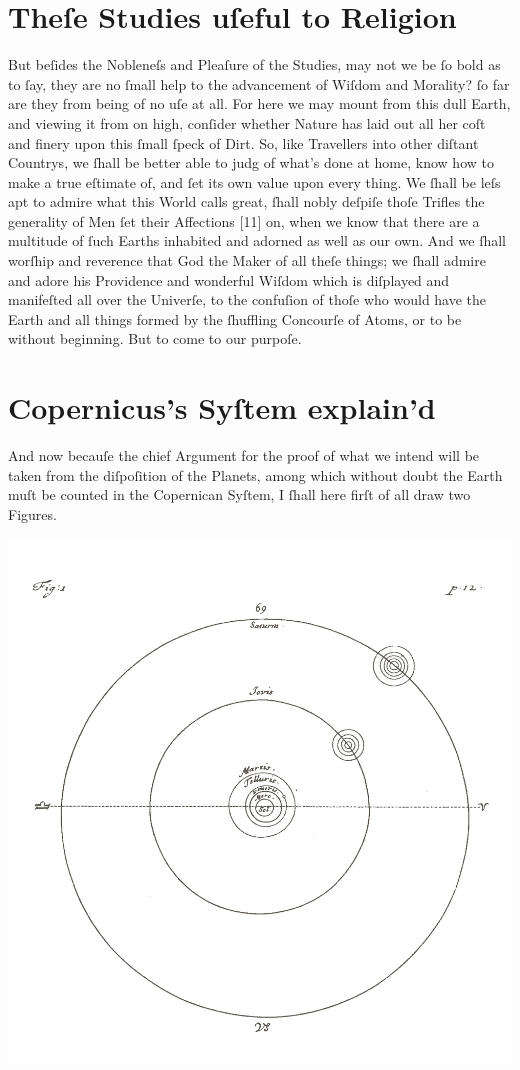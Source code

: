 \documentclass[letterpaper]{book}
\begin{document}
\section{Theſe Studies uſeful to Religion}

But beſides the Nobleneſs and Pleaſure of the Studies, may not we be ſo bold
as to ſay, they are no ſmall help to the advancement of Wiſdom and Morality?
ſo far are they from being of no uſe at all. For here we may mount from this
dull Earth, and viewing it from on high, conſider whether Nature has laid
out all her coſt and finery upon this ſmall ſpeck of Dirt.  So, like
Travellers into other diſtant Countrys, we ſhall be better able to judg of
what's done at home, know how to make a true eſtimate of, and ſet its own
value upon every thing. We ſhall be leſs apt to admire what this World calls
great, ſhall nobly deſpiſe thoſe Trifles the generality of Men ſet their
Affections [11] on, when we know that there are a multitude of ſuch Earths
inhabited and adorned as well as our own. And we ſhall worſhip and reverence
that God the Maker of all theſe things; we ſhall admire and adore his
Providence and wonderful Wiſdom which is diſplayed and manifeſted all over
the Univerſe, to the confuſion of thoſe who would have the Earth and all
things formed by the ſhuffling Concourſe of Atoms, or to be without
beginning. But to come to our purpoſe.


\section{Copernicus's Syſtem explain'd}

And now becauſe the chief Argument for the proof of what we intend will be
taken from the diſpoſition of the Planets, among which without doubt the
Earth muſt be counted in the Copernican Syſtem, I ſhall here firſt of all
draw two Figures. 

\begin{center}
	\includegraphics[width=.90 \textwidth]{ct_1_en.jpg}
\end{center}
\end{document}
